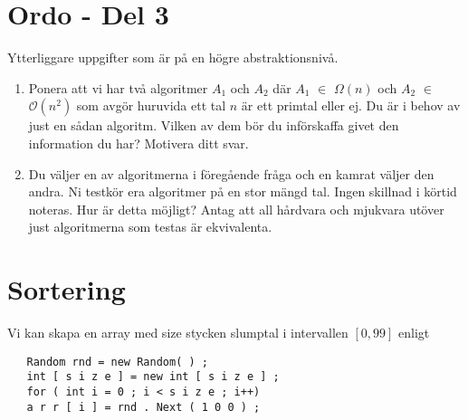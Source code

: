 \documentclass{article}
\begin{document}
   \section*{Ordo - Del 3
      }

  Ytterliggare uppgifter som är på en högre abstraktionsnivå.
  \begin{enumerate}
  
   
      \item Ponera att vi har två algoritmer $A_1$ och $A_2$ där  $A_1$ $\in$ $\Omega (n)$ och  $A_2$ $\in$ $\mathcal{O}(n^2)$ som avgör huruvida ett tal $n$ är ett primtal eller ej. Du är i behov av just en sådan algoritm. Vilken av dem bör du införskaffa givet den information du har? Motivera ditt svar.
	      
      \item Du väljer en av algoritmerna i föregående fråga och en kamrat väljer den andra. Ni
      testkör era algoritmer på en stor mängd tal. Ingen skillnad i körtid noteras. Hur är
      detta möjligt? Antag att all hårdvara och mjukvara utöver just algoritmerna som testas
      är ekvivalenta.
      
    \end{enumerate}
  \section*{Sortering}
  Vi kan skapa en array med size stycken slumptal i intervallen $[0, 99]$ enligt
  \begin{lstlisting}
   Random rnd = new Random( ) ;
   int [ s i z e ] = new int [ s i z e ] ;
   for ( int i = 0 ; i < s i z e ; i++)
   a r r [ i ] = rnd . Next ( 1 0 0 ) ;
  \end{lstlisting}
  
\end{document}
